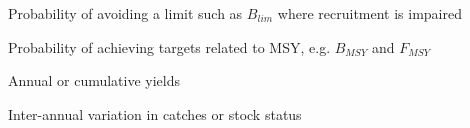 \begin{description}[labelindent=\parindent,noitemsep,topsep=0pt,parsep=0pt,partopsep=0pt]
 \item[Safety] Probability of avoiding a limit such as  $B_{lim}$ where recruitment is impaired
 \item[Status] Probability of achieving targets related to MSY, e.g.  $B_{MSY}$ and $F_{MSY}$
 \item[Yield] Annual or cumulative yields
 \item[Variability] Inter-annual variation in catches or stock status
\end{description}







